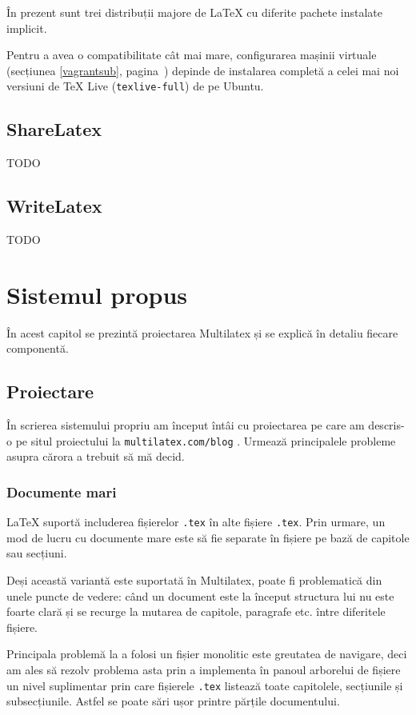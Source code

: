 \documentclass[a4wide,12pt]{report}
\newcommand{\cod}[1]{\texttt{#1}}
\newcommand{\idee}[1]{{\color{red} #1}}
\begin{document}
În prezent sunt trei distribuții\cite{majordist} majore de \LaTeX{} cu diferite
pachete instalate implicit.

Pentru a avea o compatibilitate cât mai mare, configurarea mașinii virtuale
(secțiunea \ref{vagrantsub}, pagina~\pageref{vagrantsub}) depinde de instalarea
completă a celei mai noi versiuni de \TeX{} Live (\cod{texlive-full}) de pe
Ubuntu.

\section{ShareLatex}

\idee{TODO}

\section{WriteLatex}

\idee{TODO}

\chapter{Sistemul propus}

În acest capitol se prezintă proiectarea Multilatex și se explică în detaliu
fiecare componentă.

\section{Proiectare}

În scrierea sistemului propriu am început întâi cu proiectarea pe care am
descris-o pe situl proiectului la \cod{multilatex.com/blog} . Urmează
principalele probleme asupra cărora a trebuit să mă decid.

\subsection{Documente mari}

\LaTeX{} suportă includerea fișierelor \cod{.tex} în alte fișiere \cod{.tex}.
Prin urmare, un mod de lucru cu documente mare este să fie separate în fișiere
pe bază de capitole sau secțiuni.

Deși această variantă este suportată în Multilatex, poate fi problematică din
unele puncte de vedere: când un document este la început structura lui nu este
foarte clară și se recurge la mutarea de capitole, paragrafe etc. între
diferitele fișiere.

Principala problemă la a folosi un fișier monolitic este greutatea de navigare,
deci am ales să rezolv problema asta prin a implementa în panoul arborelui de
fișiere un nivel suplimentar prin care fișierele \cod{.tex} listează toate
capitolele, secțiunile și subsecțiunile. Astfel se poate sări ușor printre
părțile documentului.
\end{document}
